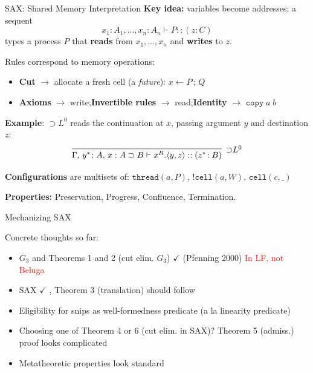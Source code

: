 \documentclass[9ps]{beamer}
\begin{document}
\begin{frame}{SAX: Shared Memory Interpretation}
\scriptsize
\textbf{Key idea:} variables become addresses; a sequent
\[
  x_1 : A_1, \ldots, x_n : A_n \vdash P :: (z : C)
\]
types a process $P$ that \textbf{reads} from $x_1, \ldots, x_n$ and \textbf{writes} to $z$.

\medskip
Rules correspond to memory operations:
\begin{itemize}
\item \textbf{Cut} $\to$ allocate a fresh cell (a \emph{future}): $x
  \leftarrow P\,;\,Q$  
\item \textbf{Axioms} $\to$ write;\quad \textbf{Invertible rules} $\to$
  read;\quad \textbf{Identity} $\to$ $\mathtt{copy}\; a\; b$
\end{itemize}

\medskip
\textbf{Example}: ${\supset}L^0$ reads the continuation at $x$,
passing argument $y$ and destination $z$:
\[
  \infer[{\supset}L^0]
    {\Gamma,\, y^*\!:A,\, x : A \supset B \vdash x^R.\langle y, z\rangle :: (z^*\!:B)}{}
\]

\medskip
\textbf{Configurations} are multisets of:
$\mathtt{thread}(a,P)$,\;
$!\mathtt{cell}(a, W)$,\;
$\mathtt{cell}(c, \_)$ 

\medskip
\textbf{Properties:} Preservation, Progress, Confluence, Termination.
\end{frame}

\begin{frame}{Mechanizing SAX}

  Concrete thoughts so far:
    \begin{itemize}
      \item $G_3$ and Theorems 1 and 2 (cut elim. $G_3$) $\checkmark$ (Pfenning 2000) \textcolor{red}{In LF, not Beluga}
      \item SAX $\checkmark$ , Theorem 3 (translation) should follow
      \item Eligibility for snips as well-formedness predicate (a la linearity predicate)
      \item Choosing one of Theorem 4 or 6 (cut elim. in SAX)? Theorem 5 (admiss.) proof looks complicated
      \item Metatheoretic properties look standard
    \end{itemize}
\end{frame}
\end{document}
